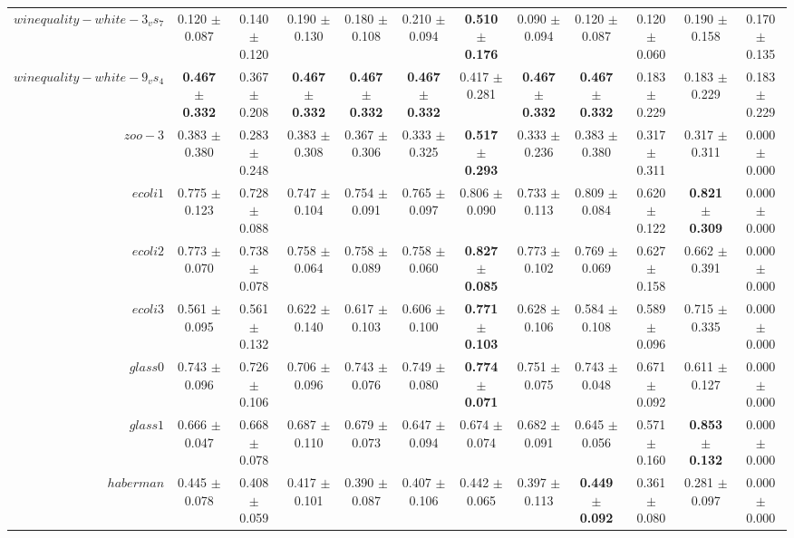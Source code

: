 \begin{table}[!ht]
{\begin{tabular}{r c c c c c c c c c c c}
$winequality-white-3_vs_7$ & 0.120 $\pm$ 0.087 & 0.140 $\pm$ 0.120 & 0.190 $\pm$ 0.130 & 0.180 $\pm$ 0.108 & 0.210 $\pm$ 0.094 & \textbf{0.510 $\pm$ 0.176} & 0.090 $\pm$ 0.094 & 0.120 $\pm$ 0.087 & 0.120 $\pm$ 0.060 & 0.190 $\pm$ 0.158 & 0.170 $\pm$ 0.135 \\
$winequality-white-9_vs_4$ & \textbf{0.467 $\pm$ 0.332} & 0.367 $\pm$ 0.208 & \textbf{0.467 $\pm$ 0.332} & \textbf{0.467 $\pm$ 0.332} & \textbf{0.467 $\pm$ 0.332} & 0.417 $\pm$ 0.281 & \textbf{0.467 $\pm$ 0.332} & \textbf{0.467 $\pm$ 0.332} & 0.183 $\pm$ 0.229 & 0.183 $\pm$ 0.229 & 0.183 $\pm$ 0.229 \\
$zoo-3$ & 0.383 $\pm$ 0.380 & 0.283 $\pm$ 0.248 & 0.383 $\pm$ 0.308 & 0.367 $\pm$ 0.306 & 0.333 $\pm$ 0.325 & \textbf{0.517 $\pm$ 0.293} & 0.333 $\pm$ 0.236 & 0.383 $\pm$ 0.380 & 0.317 $\pm$ 0.311 & 0.317 $\pm$ 0.311 & 0.000 $\pm$ 0.000 \\
$ecoli1$ & 0.775 $\pm$ 0.123 & 0.728 $\pm$ 0.088 & 0.747 $\pm$ 0.104 & 0.754 $\pm$ 0.091 & 0.765 $\pm$ 0.097 & 0.806 $\pm$ 0.090 & 0.733 $\pm$ 0.113 & 0.809 $\pm$ 0.084 & 0.620 $\pm$ 0.122 & \textbf{0.821 $\pm$ 0.309} & 0.000 $\pm$ 0.000 \\
$ecoli2$ & 0.773 $\pm$ 0.070 & 0.738 $\pm$ 0.078 & 0.758 $\pm$ 0.064 & 0.758 $\pm$ 0.089 & 0.758 $\pm$ 0.060 & \textbf{0.827 $\pm$ 0.085} & 0.773 $\pm$ 0.102 & 0.769 $\pm$ 0.069 & 0.627 $\pm$ 0.158 & 0.662 $\pm$ 0.391 & 0.000 $\pm$ 0.000 \\
$ecoli3$ & 0.561 $\pm$ 0.095 & 0.561 $\pm$ 0.132 & 0.622 $\pm$ 0.140 & 0.617 $\pm$ 0.103 & 0.606 $\pm$ 0.100 & \textbf{0.771 $\pm$ 0.103} & 0.628 $\pm$ 0.106 & 0.584 $\pm$ 0.108 & 0.589 $\pm$ 0.096 & 0.715 $\pm$ 0.335 & 0.000 $\pm$ 0.000 \\
$glass0$ & 0.743 $\pm$ 0.096 & 0.726 $\pm$ 0.106 & 0.706 $\pm$ 0.096 & 0.743 $\pm$ 0.076 & 0.749 $\pm$ 0.080 & \textbf{0.774 $\pm$ 0.071} & 0.751 $\pm$ 0.075 & 0.743 $\pm$ 0.048 & 0.671 $\pm$ 0.092 & 0.611 $\pm$ 0.127 & 0.000 $\pm$ 0.000 \\
$glass1$ & 0.666 $\pm$ 0.047 & 0.668 $\pm$ 0.078 & 0.687 $\pm$ 0.110 & 0.679 $\pm$ 0.073 & 0.647 $\pm$ 0.094 & 0.674 $\pm$ 0.074 & 0.682 $\pm$ 0.091 & 0.645 $\pm$ 0.056 & 0.571 $\pm$ 0.160 & \textbf{0.853 $\pm$ 0.132} & 0.000 $\pm$ 0.000 \\
$haberman$ & 0.445 $\pm$ 0.078 & 0.408 $\pm$ 0.059 & 0.417 $\pm$ 0.101 & 0.390 $\pm$ 0.087 & 0.407 $\pm$ 0.106 & 0.442 $\pm$ 0.065 & 0.397 $\pm$ 0.113 & \textbf{0.449 $\pm$ 0.092} & 0.361 $\pm$ 0.080 & 0.281 $\pm$ 0.097 & 0.000 $\pm$ 0.000 \\

\end{tabular}}
\end{table}
